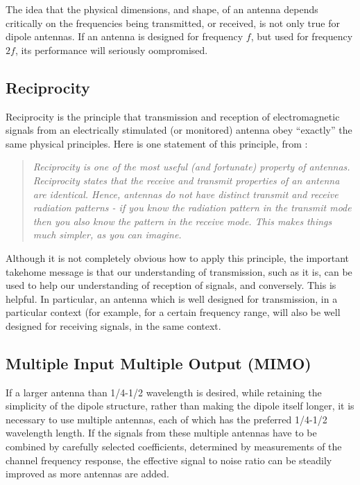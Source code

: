 The idea that the physical dimensions, and shape, of an antenna depends critically on the
frequencies being transmitted, or received, is not only true for dipole antennas. If an antenna
is designed for frequency $f$, but used for frequency $2f$, its performance will seriously
oompromised.

\subsection{Reciprocity}

Reciprocity is the principle that transmission and reception of electromagnetic signals
from an electrically stimulated (or monitored) antenna obey ``exactly'' the same physical
principles. Here is one statement of this principle, from \cite{antennatheory}:
\begin{quote}\em
Reciprocity is one of the most useful (and fortunate) property of
antennas. Reciprocity states that the receive and transmit properties of
an antenna are identical. Hence, antennas do not have distinct transmit
and receive radiation patterns - if you know the radiation pattern in the
transmit mode then you also know the pattern in the receive mode. This
makes things much simpler, as you can imagine.  
\end{quote}

Although it is not completely obvious how to apply this principle, the
important takehome message is that our understanding of transmission,
such as it is, can be used to help our understanding of reception of
signals, and conversely.  This is helpful. In particular, an antenna
which is well designed for transmission, in a particular context (for
example, for a certain frequency range, will also be well designed for
receiving signals, in the same context.

\subsection{Multiple Input Multiple Output (MIMO)}\label{mimo}

If a larger antenna than 1/4-1/2 wavelength is desired, while retaining the simplicity of the
dipole structure, rather than making the dipole itself longer, it is necessary to use multiple
antennas, each of which has the preferred 1/4-1/2 wavelength length. If the signals from these
multiple antennas have to be combined by carefully selected coefficients, determined by measurements
of the channel frequency response, the effective signal to noise ratio can be steadily improved
as more antennas are added. 

